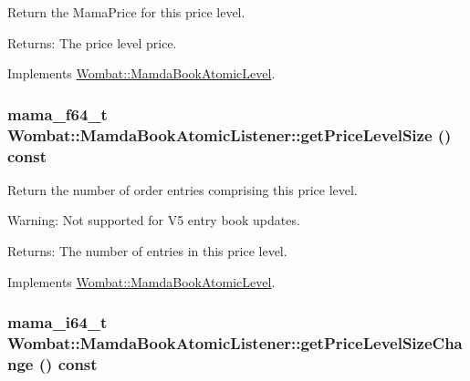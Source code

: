 Return the Mama\-Price for this price level. 

\begin{Desc}
\item[Returns:]The price level price. \end{Desc}


Implements \hyperlink{classWombat_1_1MamdaBookAtomicLevel_e250b6d0ba73f1396a7ac16a18564fc7}{Wombat::Mamda\-Book\-Atomic\-Level}.\hypertarget{classWombat_1_1MamdaBookAtomicListener_9bb50db078f337545e39e94cfcb89f0e}{
\subsubsection[getPriceLevelSize]{\setlength{\rightskip}{0pt plus 5cm}mama\_\-f64\_\-t Wombat::Mamda\-Book\-Atomic\-Listener::get\-Price\-Level\-Size () const}}
\label{classWombat_1_1MamdaBookAtomicListener_9bb50db078f337545e39e94cfcb89f0e}


Return the number of order entries comprising this price level. 

\begin{Desc}
\item[Warning:]Not supported for V5 entry book updates.\end{Desc}
\begin{Desc}
\item[Returns:]The number of entries in this price level. \end{Desc}


Implements \hyperlink{classWombat_1_1MamdaBookAtomicLevel_bf9d9609a53a7344d6232ba70407d069}{Wombat::Mamda\-Book\-Atomic\-Level}.\hypertarget{classWombat_1_1MamdaBookAtomicListener_f94e0c100149bd2543be4c5c5ae891a2}{
\subsubsection[getPriceLevelSizeChange]{\setlength{\rightskip}{0pt plus 5cm}mama\_\-i64\_\-t Wombat::Mamda\-Book\-Atomic\-Listener::get\-Price\-Level\-Size\-Change () const}}
\label{classWombat_1_1MamdaBookAtomicListener_f94e0c100149bd2543be4c5c5ae891a2}


